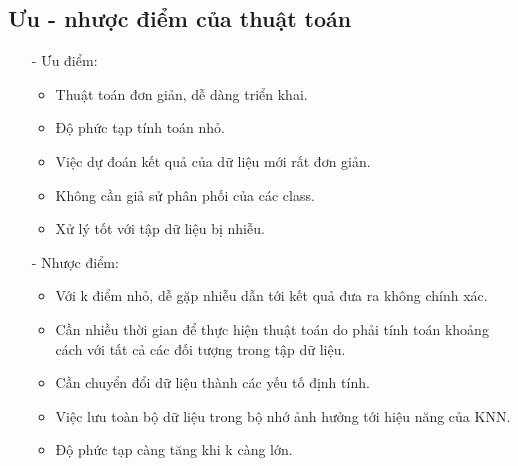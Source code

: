 \documentclass{report}
\begin{document}
        \fontsize{15}{10}\selectfont
        \subsection{Ưu - nhược điểm của thuật toán}
            \begin{enumerate}
                \item [- ] Ưu điểm:
                    \begin{itemize}
                        \item Thuật toán đơn giản, dễ dàng triển khai.
                        \item Độ phức tạp tính toán nhỏ.
                        \item Việc dự đoán kết quả của dữ liệu mới rất đơn giản.
                        \item Không cần giả sử phân phối của các class.
                        \item Xử lý tốt với tập dữ liệu bị nhiễu.
                    \end{itemize}
                \item [- ] Nhược điểm:
                    \begin{itemize}
                        \item Với k điểm nhỏ, dễ gặp nhiễu dẫn tới kết quả đưa ra không chính xác.
                        \item Cần nhiều thời gian để thực hiện thuật toán do phải tính toán khoảng cách với tất cả các đối tượng trong tập dữ liệu.
                        \item Cần chuyển đổi dữ liệu thành các yếu tố định tính.
                        \item Việc lưu toàn bộ dữ liệu trong bộ nhớ ảnh hưởng tới hiệu năng của KNN.
                        \item Độ phức tạp càng tăng khi k càng lớn.
                    \end{itemize}
            \end{enumerate}
    
    \fontsize{16}{10}\selectfont
\end{document}
